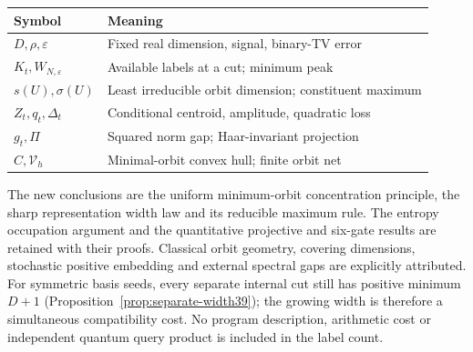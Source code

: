 \begin{center}
\begin{tabular}{@{}ll@{}}\toprule
Symbol & Meaning \\ \midrule
$D,\rho,\varepsilon$ & Fixed real dimension, signal, binary-TV error \\
$K_t,W_{N,\varepsilon}$ & Available labels at a cut; minimum peak \\
$s(U),\sigma(U)$ & Least irreducible orbit dimension; constituent maximum \\
$Z_t,q_t,\Delta_t$ & Conditional centroid, amplitude, quadratic loss \\
$g_t,\Pi$ & Squared norm gap; Haar-invariant projection \\
$C,\mathcal V_h$ & Minimal-orbit convex hull; finite orbit net \\
\bottomrule
\end{tabular}
\end{center}

The new conclusions are the uniform minimum-orbit concentration
principle, the sharp representation width law and its reducible
maximum rule. The entropy occupation argument and the quantitative
projective and six-gate results are retained with their proofs.
Classical orbit geometry, covering dimensions, stochastic positive
embedding and external spectral gaps are explicitly attributed.
For symmetric basis seeds, every separate internal cut still has
positive minimum $D+1$ (Proposition~\ref{prop:separate-width39}); the
growing width is therefore a simultaneous compatibility cost.
No program description, arithmetic cost or independent quantum query
product is included in the label count.
